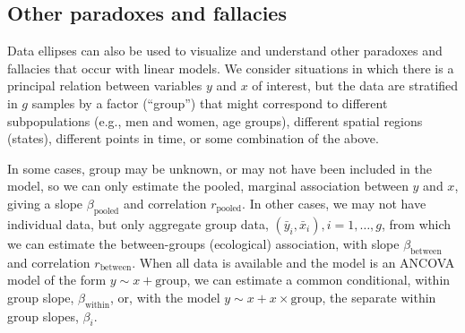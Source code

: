 \subsection{Other paradoxes and fallacies}
Data ellipses can also be used to visualize and understand other paradoxes and
fallacies that occur with linear models.  We consider situations in which there
is a principal relation between variables $y$ and $x$ of interest, but the data
are stratified in $g$  samples by a factor (``group'') that might correspond
to different subpopulations (e.g., men and women, age groups),
different spatial regions (states), different points in time, or some
combination of the above.

In some cases, group may be unknown, or may not have been included in the model,
so we can only estimate the pooled, marginal association between $y$ and $x$,
giving a slope $\beta_{\textrm{pooled}}$ and correlation $r_{\textrm{pooled}}$.
In other cases, we may not have individual data, but only aggregate group
data, $(\bar{y}_i, \bar{x}_i), i=1, \dots , g$, from which we can estimate
the between-groups (ecological) association, with slope
$\beta_{\textrm{between}}$ and correlation $r_{\textrm{between}}$.
When all data is available and the model is an ANCOVA model of the form
$y \sim x + \textrm{group}$, 
we can estimate a common conditional, within group slope,
$\beta_{\textrm{within}}$, or, with the model $y \sim x + x \times \textrm{group}$,
the separate within group slopes, $\beta_i$. 


